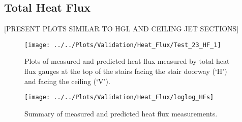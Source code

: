 \clearpage
\subsection{Total Heat Flux}
[PRESENT PLOTS SIMILAR TO HGL AND CEILING JET SECTIONS]
\begin{figure}[!h]
	\centering
	\texttt{[image: ../../Plots/Validation/Heat\_Flux/Test\_23\_HF\_1]}
	\caption[Plots of measured and predicted heat flux during Test~23.]{Plots of measured and predicted heat flux measured by total heat flux gauges at the top of the stairs facing the stair doorway (`H') and facing the ceiling (`V').}
	\label{fig:Test23_HF1}
\end{figure}

\begin{figure}[!h]
	\centering
	\texttt{[image: ../../Plots/Validation/Heat\_Flux/loglog\_HFs]}
	\caption{Summary of measured and predicted heat flux measurements.}
	\label{fig:loglog_HFs}
\end{figure}

\clearpage
